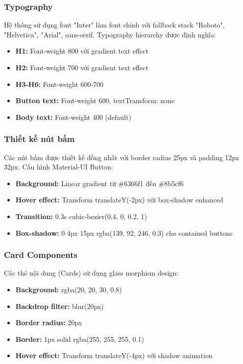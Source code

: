 \subsubsection{Typography}

Hệ thống sử dụng font "Inter" làm font chính với fallback stack "Roboto", "Helvetica", "Arial", sans-serif. Typography hierarchy được định nghĩa:
\begin{itemize}
    \item \textbf{H1:} Font-weight 800 với gradient text effect
    \item \textbf{H2:} Font-weight 700 với gradient text effect  
    \item \textbf{H3-H6:} Font-weight 600-700
    \item \textbf{Button text:} Font-weight 600, textTransform: none
    \item \textbf{Body text:} Font-weight 400 (default)
\end{itemize}

\subsubsection{Thiết kế nút bấm}

Các nút bấm được thiết kế đồng nhất với border radius 25px và padding 12px 32px. Cấu hình Material-UI Button:
\begin{itemize}
    \item \textbf{Background:} Linear gradient từ \#6366f1 đến \#8b5cf6
    \item \textbf{Hover effect:} Transform translateY(-2px) với box-shadow enhanced
    \item \textbf{Transition:} 0.3s cubic-bezier(0.4, 0, 0.2, 1)
    \item \textbf{Box-shadow:} 0 4px 15px rgba(139, 92, 246, 0.3) cho contained buttons
\end{itemize}

\subsubsection{Card Components}

Các thẻ nội dung (Cards) sử dụng glass morphism design:
\begin{itemize}
    \item \textbf{Background:} rgba(20, 20, 30, 0.8)
    \item \textbf{Backdrop filter:} blur(20px)
    \item \textbf{Border radius:} 20px
    \item \textbf{Border:} 1px solid rgba(255, 255, 255, 0.1)
    \item \textbf{Hover effect:} Transform translateY(-4px) với shadow animation
\end{itemize}

